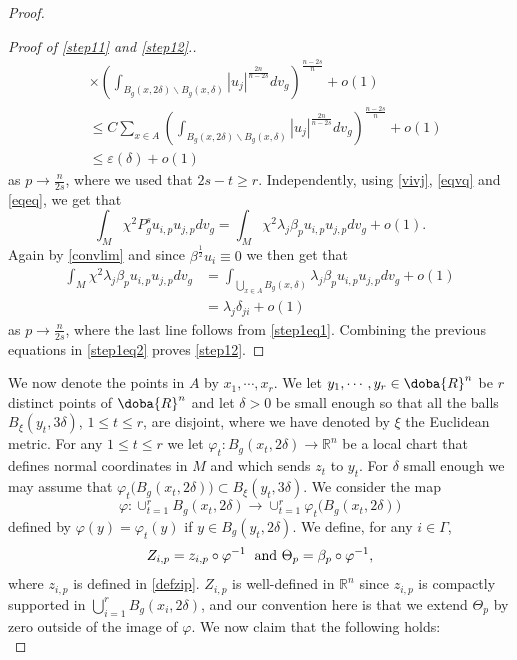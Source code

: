 \documentclass[10pt]{amsart}
\numberwithin{equation}{section}
\newcommand{\R}{\mathbb{R}}
\def\de{{\delta}}
\def\phi{{\varphi}}
\gdef\mR{\doba{R}}
\newcommand{\ve}{\varepsilon}
\theoremstyle{plain}
\theoremstyle{remark}
\begin{document}
\begin{proof}
\begin{proof}[Proof of \eqref{step11} and \eqref{step12}.]
$$\begin{aligned}
& \times \left(\int_{B_g(x,2\delta) \backslash B_g(x, \delta)} |u_j|^{\frac{2n}{n-2s}} dv_g  \right)^{\frac{n-2s}{n}} + o(1) \\
& \le C \sum_{x \in A}  \left(\int_{B_g(x,2\delta) \backslash B_g(x, \delta)} |u_j|^{\frac{2n}{n-2s}} dv_g  \right)^{\frac{n-2s}{n}} + o(1)\\
&  \le \ve(\delta) + o(1)
\end{aligned} $$
as $p \to \frac{n}{2s}$, where we used that $2s-t \ge r$. Independently, using \eqref{vivj}, \eqref{eqvq} and \eqref{eqeq}, we get that 
$$  \int_M \chi^2 P_g^s u_{i,p} u_{j,p} dv_g =  \int_M \chi^2 \lambda_j \beta_p u_{i,p} u_{j,p} dv_g + o(1) . $$
Again by \eqref{convlim} and since $\beta^{\frac12} u_i \equiv 0$ we then get that 
$$ \begin{aligned}
 \int_M \chi^2 \lambda_j \beta_p u_{i,p} u_{j,p} dv_g & = \int_{\bigcup_{x \in A} B_g(x,\delta)} \lambda_j \beta_p u_{i,p} u_{j,p} dv_g  + o(1) \\
 & = \lambda_j \delta_{ji} + o(1) 
 \end{aligned} $$
 as $p \to \frac{n}{2s}$, where the last line follows from \eqref{step1eq1}. Combining the previous equations in \eqref{step1eq2} proves  \eqref{step12}.
\end{proof}
We now denote the points in $A$ by $x_1, \cdots, x_r$. We let $y_1, \cdots, y_r \in \mR^n$ be $r$ distinct points of $\mR^n$ and let $\delta >0$ be small enough so that all the balls $B_{\xi}(y_t, 3\delta)$, $1\le t \le r$, are disjoint, where we have denoted by $\xi$ the Euclidean metric. For any $1 \le t \le r$ we let $\phi_t: B_g(x_t, 2\delta) \to \R^n$ be a local chart that defines normal coordinates in $M$ and which sends $z_t$ to $y_t$. For $\delta$ small enough we may assume that $\phi_t\big( B_g(x_t,2 \de) \big) \subset B_\xi(y_t, 3 \de)$.  We consider the map 
\begin{equation} \label{defmapphi}
\phi: \cup_{t=1}^r B_g(x_t, 2\de) \to \cup_{t=1}^r \phi_t\big( B_g(x_t,2 \de) \big)
\end{equation}
defined by $\phi(y) =  \phi_t(y)$ if $y \in B_g(y_t,2 \delta)$. We define, for any $i \in \Gamma$,
$$Z_{i,p}= z_{i,p} \circ \phi^{-1} \; \hbox{ and } \Theta_p= \beta_p \circ \phi^{-1},$$
where $z_{i,p}$ is defined in \eqref{defzip}. $Z_{i,p}$ is well-defined in $\R^n$ since $z_{i,p}$ is compactly supported in $\bigcup_{i=1}^r B_g(x_i,2 \delta)$, and our convention here is that we extend $\Theta_p$ by zero outside of the image of $\phi$. We now claim that the following holds: 
\begin{equation} \label{step21}

\end{equation}
\end{proof}
\end{document}
